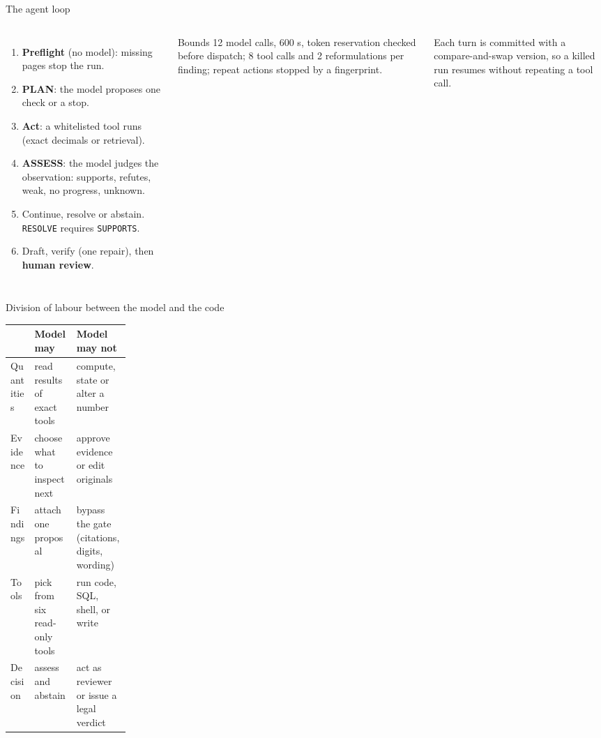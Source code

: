 \documentclass[aspectratio=169,10pt]{beamer}
\newcommand{\code}[1]{\texttt{\small #1}}
\begin{document}
\begin{frame}{The agent loop}
\begin{columns}[T]
\begin{enumerate}
\item \textbf{Preflight} (no model): missing pages stop the run.
\item \textbf{PLAN}: the model proposes one check or a stop.
\item \textbf{Act}: a whitelisted tool runs (exact decimals or retrieval).
\item \textbf{ASSESS}: the model judges the observation: supports, refutes, weak, no progress, unknown.
\item Continue, resolve or abstain. \code{RESOLVE} requires \code{SUPPORTS}.
\item Draft, verify (one repair), then \textbf{human review}.
\end{enumerate}
\begin{block}{Bounds}
12 model calls, 600 s, token reservation checked before dispatch; 8 tool calls and 2 reformulations per finding; repeat actions stopped by a fingerprint.
\end{block}
\small Each turn is committed with a compare-and-swap version, so a killed run resumes without repeating a tool call.
\end{columns}
\end{frame}

\begin{frame}{Division of labour between the model and the code}
\begin{tabularx}{\linewidth}{@{}p{0.2\linewidth} X X@{}}
\toprule
 & \textbf{Model may} & \textbf{Model may not} \\ \midrule
Quantities & read results of exact tools & compute, state or alter a number \\
Evidence & choose what to inspect next & approve evidence or edit originals \\
Findings & attach one proposal & bypass the gate (citations, digits, wording) \\
Tools & pick from six read-only tools & run code, SQL, shell, or write \\
Decision & assess and abstain & act as reviewer or issue a legal verdict \\
\bottomrule
\end{tabularx}
\end{frame}
\end{document}

